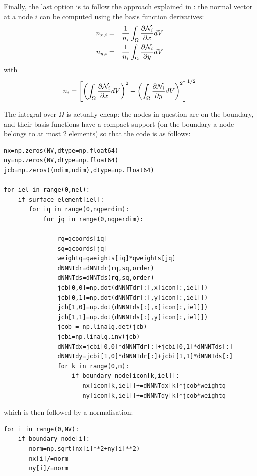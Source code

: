 Finally, the last option is to follow the approach 
explained in \textcite{ensg82}: 
the normal vector at a node $i$ can be computed using the basis function derivatives:
\begin{eqnarray}
n_{x,i} &=& \frac{1}{n_i}\int_\Omega \frac{\partial {\mathcal{N}}_i}{\partial x} dV \nonumber\\
n_{y,i} &=& \frac{1}{n_i}\int_\Omega \frac{\partial {\mathcal{N}}_i}{\partial y} dV \nonumber
\end{eqnarray}
with 
\[
n_i = \left[
\left(\int_\Omega \frac{\partial {\mathcal{N}}_i}{\partial x} dV\right)^2 +
\left(\int_\Omega \frac{\partial {\mathcal{N}}_i}{\partial y} dV\right)^2 
\right]^{1/2}
\]

The integral over $\Omega$ is actually cheap: the nodes in question are on the boundary, 
and their basis functions have a compact support (on the boundary a node belongs to at 
most 2 elements) so that the code is as follows:

\begin{lstlisting}
nx=np.zeros(NV,dtype=np.float64) 
ny=np.zeros(NV,dtype=np.float64) 
jcb=np.zeros((ndim,ndim),dtype=np.float64)

for iel in range(0,nel):
    if surface_element[iel]: 
       for iq in range(0,nqperdim):
           for jq in range(0,nqperdim):

               rq=qcoords[iq]
               sq=qcoords[jq]
               weightq=qweights[iq]*qweights[jq]
               dNNNTdr=dNNTdr(rq,sq,order)
               dNNNTds=dNNTds(rq,sq,order)
               jcb[0,0]=np.dot(dNNNTdr[:],x[icon[:,iel]])
               jcb[0,1]=np.dot(dNNNTdr[:],y[icon[:,iel]])
               jcb[1,0]=np.dot(dNNNTds[:],x[icon[:,iel]])
               jcb[1,1]=np.dot(dNNNTds[:],y[icon[:,iel]])
               jcob = np.linalg.det(jcb)
               jcbi=np.linalg.inv(jcb)
               dNNNTdx=jcbi[0,0]*dNNNTdr[:]+jcbi[0,1]*dNNNTds[:]
               dNNNTdy=jcbi[1,0]*dNNNTdr[:]+jcbi[1,1]*dNNNTds[:]
               for k in range(0,m):
                   if boundary_node[icon[k,iel]]:
                      nx[icon[k,iel]]+=dNNNTdx[k]*jcob*weightq
                      ny[icon[k,iel]]+=dNNNTdy[k]*jcob*weightq
\end{lstlisting}
which is then followed by a normalisation:
\begin{lstlisting}
for i in range(0,NV):
    if boundary_node[i]:
       norm=np.sqrt(nx[i]**2+ny[i]**2)
       nx[i]/=norm
       ny[i]/=norm
\end{lstlisting}

